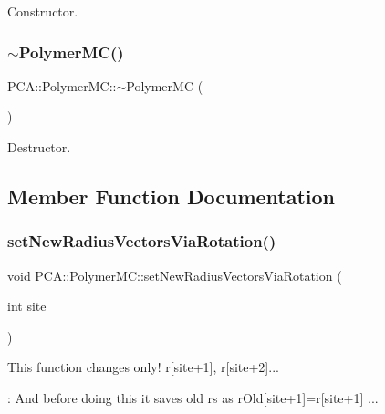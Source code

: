 Constructor. 

\hypertarget{class_p_c_a_1_1_polymer_m_c_a6ed770992221cd0a7a9e364d4d5fcda3}{}\label{class_p_c_a_1_1_polymer_m_c_a6ed770992221cd0a7a9e364d4d5fcda3} 
\subsubsection{\texorpdfstring{$\sim$\+Polymer\+M\+C()}{~PolymerMC()}}
{\footnotesize\ttfamily P\+C\+A\+::\+Polymer\+M\+C\+::$\sim$\+Polymer\+MC (\begin{DoxyParamCaption}{ }\end{DoxyParamCaption})}



Destructor. 



\subsection{Member Function Documentation}
\hypertarget{class_p_c_a_1_1_polymer_m_c_a80c92a94292d085a0d0ce0563ae0a1fd}{}\label{class_p_c_a_1_1_polymer_m_c_a80c92a94292d085a0d0ce0563ae0a1fd} 
\subsubsection{\texorpdfstring{set\+New\+Radius\+Vectors\+Via\+Rotation()}{setNewRadiusVectorsViaRotation()}}
{\footnotesize\ttfamily void P\+C\+A\+::\+Polymer\+M\+C\+::set\+New\+Radius\+Vectors\+Via\+Rotation (\begin{DoxyParamCaption}\item[{int}]{site }\end{DoxyParamCaption})}



This function changes only! r\mbox{[}site+1\mbox{]}, r\mbox{[}site+2\mbox{]}... 

\+: And before doing this it saves old r\textquotesingle{}s as r\+Old\mbox{[}site+1\mbox{]}=r\mbox{[}site+1\mbox{]} ... \hypertarget{class_p_c_a_1_1_polymer_m_c_ab7ec6ffe521bf27c218f4a6eac6c394b}{}\label{class_p_c_a_1_1_polymer_m_c_ab7ec6ffe521bf27c218f4a6eac6c394b} 
